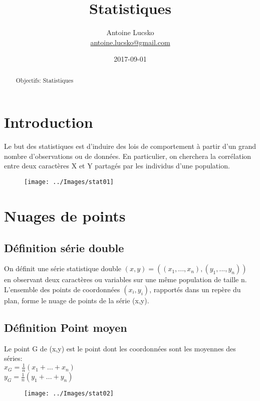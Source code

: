 \documentclass[a4paper]{report}
\title{Statistiques}
\author{
        Antoine Lucsko \\
        {\small \href{mailto: antoine.lucsko@gmail.com}{antoine.lucsko@gmail.com} }
    }
\date{2017-09-01}
\begin{document}
        \tableofcontents
        \maketitle
        
        \begin{abstract}
            Objectifs: Statistiques
        \end{abstract}
    
    \chapter{Introduction}
    Le but des statistiques est d'induire des lois de comportement à partir d'un grand nombre d'observations ou de données. En particulier, on cherchera la corrélation entre deux caractères X et Y partagés par les individus d'une population. \\
    \begin{figure}[!h]
        \texttt{[image: ../Images/stat01]}
    \end{figure}

    \pagebreak

    \chapter{Nuages de points}
    \section{Définition série double}
    On définit une série statistique double $(x,y) =((x_1, ..., x_n),(y_1, ..., y_n)) $ en observant deux caractères ou variables sur une même population de taille n. L'ensemble des points de coordonnées $(x_i,y_i)$, rapportés dans un repère du plan, forme le nuage de points de la série (x,y).
    \section{Définition Point moyen}
    Le point G de (x,y) est le point dont les coordonnées sont les moyennes des séries: \\
    $x_G = \frac{1}{n}(x_1+...+x_n)$ \\
    $y_G = \frac{1}{n}(y_1+...+y_n)$ \\
    \begin{figure}[!h]
        \texttt{[image: ../Images/stat02]}
    \end{figure}
\end{document}
